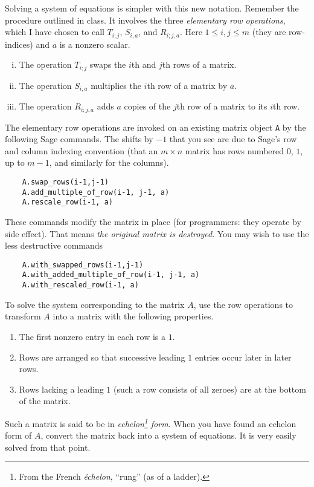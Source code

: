 \documentclass[12pt]{exam}
\theoremstyle{definition}
\begin{document}
Solving a system of equations is simpler with this new notation. Remember the procedure outlined in class. It involves the three \emph{elementary row operations}, which I have chosen to call $T_{i;j}$, $S_{i,a}$, and $R_{i;j,a}$. Here $1 \leq i, j \leq m$ (they are row-indices) and $a$ is a nonzero scalar.
\begin{enumerate}[(i)]
    \item The operation $T_{i;j}$ swaps the $i$th and $j$th rows of a matrix.
    \item The operation $S_{i,a}$ multiplies the $i$th row of a matrix by $a$.
    \item The operation $R_{i;j,a}$ adds $a$ copies of the $j$th row of a matrix to its $i$th row.
\end{enumerate}
The elementary row operations are invoked on an existing matrix object \lstinline!A! by the following Sage commands. The shifts by $-1$ that you see are due to Sage's row and column indexing convention (that an $m \times n$ matrix has rows numbered $0$, $1$, up to $m-1$, and similarly for the columns).
\begin{lstlisting}
    A.swap_rows(i-1,j-1) 
    A.add_multiple_of_row(i-1, j-1, a)
    A.rescale_row(i-1, a)
\end{lstlisting}

These commands modify the matrix in place (for programmers: they operate by side effect). That means \emph{the original matrix is destroyed}. You may wish to use the less destructive commands
\begin{lstlisting}
    A.with_swapped_rows(i-1,j-1)
    A.with_added_multiple_of_row(i-1, j-1, a)
    A.with_rescaled_row(i-1, a)
\end{lstlisting}

To solve the system corresponding to the matrix $A$, use the row operations to transform $A$ into a matrix with the following properties.
\begin{enumerate}[(1)]
    \item The first nonzero entry in each row is a $1$.
    \item Rows are arranged so that successive leading $1$ entries occur later in later rows.
    \item Rows lacking a leading $1$ (such a row consists of all zeroes) are at the bottom of the matrix.
\end{enumerate}
Such a matrix is said to be in \emph{echelon\footnote{From the French \emph{\'echelon}, ``rung'' (as of a ladder).} form}. When you have found an echelon form of $A$, convert the matrix back into a system of equations. It is very easily solved from that point.
\end{document}
